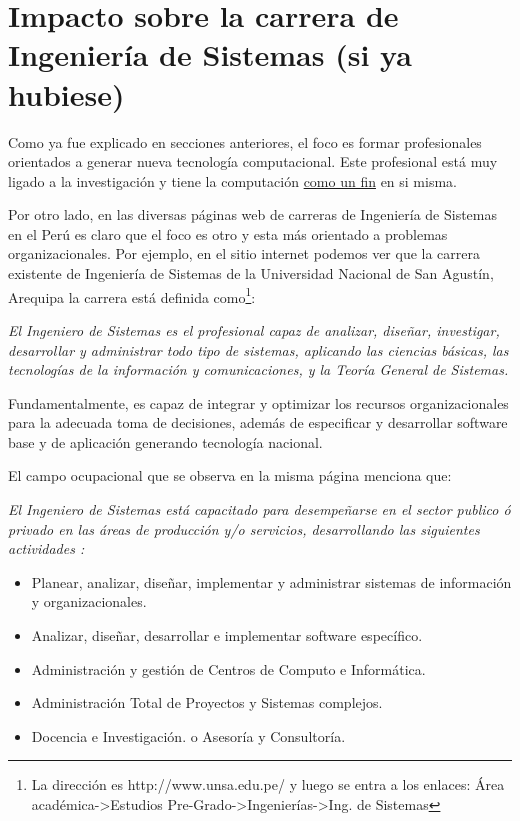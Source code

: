 \section{Impacto sobre la carrera de Ingeniería de Sistemas (si ya hubiese)}\label{sec:impacto-en-sistemas}
Como ya fue explicado en secciones anteriores, el foco es formar
profesionales orientados a generar nueva tecnología computacional.
Este profesional está muy ligado a la investigación y tiene la
computación \underline{como un fin} en si misma.

Por otro lado, en las diversas páginas web de carreras de Ingeniería de Sistemas en el Perú es claro que el foco es otro y esta más orientado a problemas organizacionales. 
Por ejemplo, en el sitio internet podemos ver que la carrera
existente de Ingeniería de Sistemas de la Universidad Nacional de San Agustín, Arequipa la carrera está definida como\footnote{La
dirección es http://www.unsa.edu.pe/ y luego se entra a los enlaces:
Área académica->Estudios Pre-Grado->Ingenierías->Ing. de Sistemas}:

{\it El Ingeniero de Sistemas es el profesional capaz de analizar, diseñar, investigar, desarrollar y 
administrar todo tipo de sistemas, aplicando las ciencias básicas, las tecnologías de la 
información y comunicaciones, y la Teoría General de Sistemas.

Fundamentalmente, es capaz de integrar y optimizar los recursos organizacionales para la adecuada 
toma de decisiones, además de especificar y desarrollar software base y de aplicación generando tecnología nacional.}

El campo ocupacional que se observa en la misma página menciona que:

{\it El Ingeniero de Sistemas está capacitado para desempeñarse en el sector publico ó privado en las 
áreas de producción y/o servicios, desarrollando las siguientes actividades :

\begin{itemize}
    \item Planear, analizar, diseñar, implementar y administrar sistemas de información y organizacionales.
    \item Analizar, diseñar, desarrollar e implementar software específico.
    \item Administración y gestión de Centros de Computo e Informática.
    \item Administración Total de Proyectos y Sistemas complejos.
    \item Docencia e Investigación. o Asesoría y Consultoría.
\end{itemize}
}

